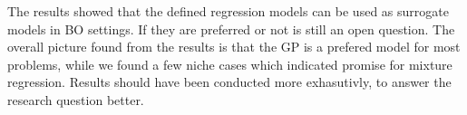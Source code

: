 The results showed that the defined regression models can be used as surrogate models in BO
settings. If they are preferred or not is still an open question. The overall picture found from the
results is that the GP is a prefered model for most problems, while we found a few niche cases which
indicated promise for mixture regression. Results should have been conducted more exhasutivly, to answer the research
question better. 
 











